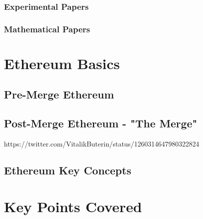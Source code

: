 \subsubsection{Experimental Papers}
\subsubsection{Mathematical Papers}
\section{Ethereum Basics}
\subsection{Pre-Merge Ethereum}
\subsection{Post-Merge Ethereum - "The Merge"}
https://twitter.com/VitalikButerin/status/1260314647980322824
\subsection{Ethereum Key Concepts}
\section{Key Points Covered}
